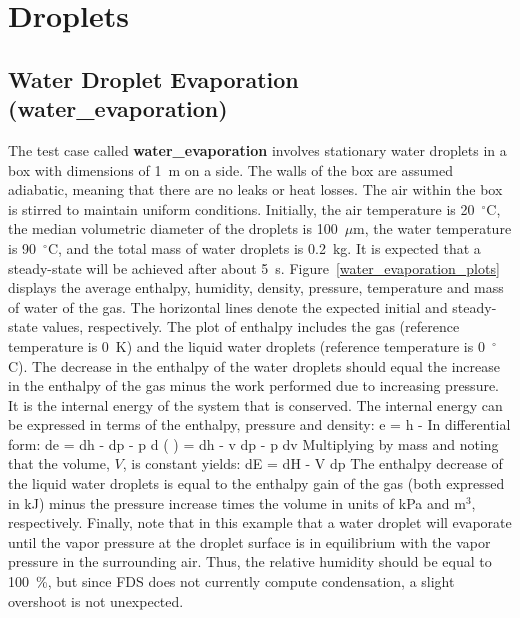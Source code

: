 \documentclass[11pt]{book}
\begin{document}
\chapter{Droplets}


\section{Water Droplet Evaporation (\texorpdfstring{{\bf water\_evaporation}}{water\_evaporation}) }
\label{water_evaporation}

The test case called {\bf water\_evaporation} involves stationary
water droplets in a box with dimensions of 1~m on a side. The walls of the box
are assumed adiabatic, meaning that there are no leaks or heat losses. The air
within the box is stirred to maintain uniform conditions. Initially, the air temperature is 20~$^\circ$C,
the median volumetric diameter of the droplets is 100~$\mu$m,
the water temperature is 90~$^\circ$C, and the total mass of water droplets is 0.2~kg.
It is expected that a steady-state will be achieved after about 5~s.
Figure~\ref{water_evaporation_plots} displays the average enthalpy, humidity, density, pressure, temperature and mass of water of the gas. The horizontal lines denote the
expected initial and steady-state values, respectively.
The plot of enthalpy includes the gas (reference temperature is 0~K) and the liquid water droplets (reference temperature is 0~$^\circ$C).
The decrease in the enthalpy of the water droplets should equal the increase in the enthalpy of the gas minus the work performed due to increasing pressure. It is the internal
energy of the system that is conserved. The internal energy can be expressed in terms of the enthalpy, pressure and density:
\be e = h -  \ee
In differential form:
\be de = dh -  \; dp - p \; d \left( \right) = dh - v \; dp - p \; dv \ee
Multiplying by mass and noting that the volume, $V$, is constant yields:
\be dE = dH - V \; dp \ee
The enthalpy decrease of the liquid water droplets is equal to the enthalpy gain of the gas (both expressed in kJ) minus the pressure increase times the volume in units of kPa
and m$^3$, respectively.
Finally, note that in this example that a water droplet will evaporate until the vapor pressure at the droplet surface is in equilibrium with the vapor pressure in the surrounding air. Thus, the relative humidity should be equal to 100~\%, but since FDS does not currently compute condensation, a slight overshoot is not unexpected.
\end{document}
